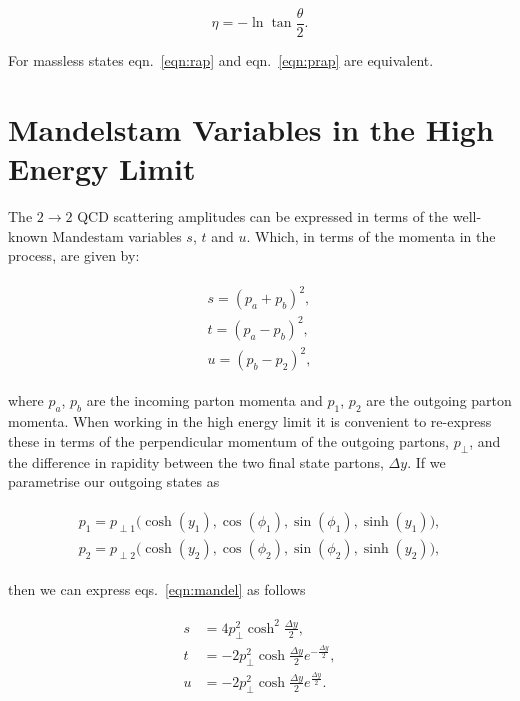 		\begin{equation}
			\eta = -\ln\tan\frac{\theta}{2}.
			\label{eqn:prap}
		\end{equation}

		For massless states eqn.~\eqref{eqn:rap} and eqn.~\eqref{eqn:prap} are equivalent.

	\section{Mandelstam Variables in the High Energy Limit}
		\label{sub:MandelstamVariables}

		The $2\rightarrow 2$ QCD scattering amplitudes can be expressed in terms of the well-known Mandestam
		variables $s$, $t$ and $u$.  Which, in terms of the momenta in the process, are given by:

		\begin{align}
		\begin{split}
			s = (p_a + p_b)^2, \\
			t = (p_a - p_b)^2, \\
			u = (p_b - p_2)^2,
			\label{eqn:mandel}
		\end{split}
		\end{align}

		where $p_a$, $p_b$ are the incoming parton momenta and $p_1$, $p_2$ are the outgoing parton momenta.
		When working in the high energy limit it is convenient to re-express these in terms of the
		perpendicular momentum of the outgoing partons, $p_\perp$, and the difference in rapidity
		between the two final state partons, $\Delta y$.  If we parametrise our outgoing states as

		\begin{align}
		\begin{split}
			p_1 = p_{\perp1}\big(\cosh (y_1), \cos(\phi_1), \sin(\phi_1), \sinh (y_1)\big),\\
			p_2 = p_{\perp2}\big(\cosh (y_2), \cos(\phi_2), \sin(\phi_2), \sinh (y_2)\big),
		\end{split}
		\end{align}

		then we can express eqs.~\eqref{eqn:mandel} as follows

		\begin{align}
		\begin{split}
			s &=  4p_\perp^2 \cosh^2\frac{\Delta y}{2}, \\
			t &= -2p_\perp^2 \cosh  \frac{\Delta y}{2}e^{-\frac{\Delta y}{2}}, \\
			u &= -2p_\perp^2 \cosh  \frac{\Delta y}{2}e^{ \frac{\Delta y}{2}}.
		\end{split}
		\end{align}

